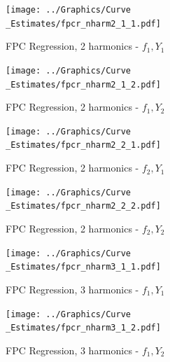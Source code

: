 \documentclass[11pt,twoside,a4paper]{article}
\begin{document}
	\begin{figure}[H]
		\centering
		\begin{minipage}{.5\textwidth}
			\centering
			\texttt{[image: ../Graphics/Curve\\\_Estimates/fpcr\_nharm2\_1\_1.pdf]}
			\caption{FPC Regression, 2 harmonics - $f_1, Y_1$}
			\label{fpcr_nharm2_1_1}
		\end{minipage}%
		\begin{minipage}{.5\textwidth}
			\centering
			\texttt{[image: ../Graphics/Curve\\\_Estimates/fpcr\_nharm2\_1\_2.pdf]}
			\caption{FPC Regression, 2 harmonics - $f_1, Y_2$}
			\label{fpcr_nharm2_1_2}
			
		\end{minipage}
	\end{figure}
	
	\begin{figure}[H]
		\centering
		\begin{minipage}{.5\textwidth}
			\centering
			\texttt{[image: ../Graphics/Curve\\\_Estimates/fpcr\_nharm2\_2\_1.pdf]}
			\caption{FPC Regression, 2 harmonics - $f_2, Y_1$}
			\label{fpcr_nharm2_2_1}
		\end{minipage}%
		\begin{minipage}{.5\textwidth}
			\centering
			\texttt{[image: ../Graphics/Curve\\\_Estimates/fpcr\_nharm2\_2\_2.pdf]}
			\caption{FPC Regression, 2 harmonics - $f_2, Y_2$}
			\label{fpcr_nharm2_2_2}
		\end{minipage}
	\end{figure}
	
	\begin{figure}[H]
		\centering
		\begin{minipage}{.5\textwidth}
			\centering
			\texttt{[image: ../Graphics/Curve\\\_Estimates/fpcr\_nharm3\_1\_1.pdf]}
			\caption{FPC Regression, 3 harmonics - $f_1, Y_1$}
			\label{fpcr_nharm3_1_1}
		\end{minipage}%
		\begin{minipage}{.5\textwidth}
			\centering
			\texttt{[image: ../Graphics/Curve\\\_Estimates/fpcr\_nharm3\_1\_2.pdf]}
			\caption{FPC Regression, 3 harmonics - $f_1, Y_2$}
			\label{fpcr_nharm3_1_2}
		\end{minipage}
	\end{figure}
	
\end{document}
